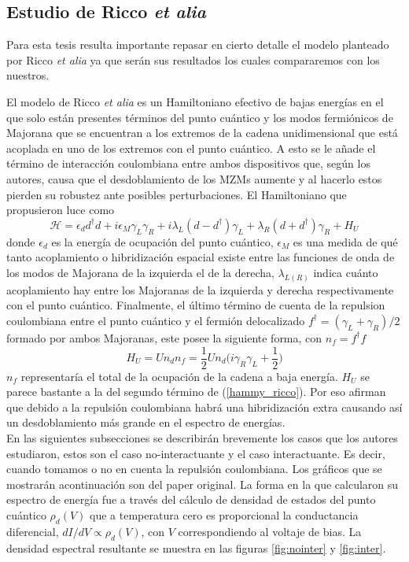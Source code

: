 \subsection{Estudio de Ricco \emph{et alia}}
Para esta tesis resulta importante repasar en cierto detalle el modelo planteado por Ricco \emph{et alia} ya que ser\'{a}n sus resultados los cuales compararemos con los nuestros.

El modelo de Ricco \emph{et alia} es un Hamiltoniano efectivo de bajas energ\'{i}as en el que solo est\'{a}n presentes t\'{e}rminos del punto cu\'{a}ntico y los modos fermi\'{o}nicos de Majorana que se encuentran a los extremos de la cadena unidimensional que est\'{a} acoplada en uno de los extremos con el punto cu\'{a}ntico. A esto se le a\~{n}ade el t\'{e}rmino de interacci\'{o}n coulombiana entre ambos dispositivos que, seg\'{u}n los autores, causa que el desdoblamiento de los MZMs aumente y al hacerlo estos pierden su robustez ante posibles perturbaciones. El Hamiltoniano que propusieron luce como 
\begin{equation}
    \mathcal{H}=\epsilon_d d^\dagger d + i\epsilon_M \gamma_L\gamma_R + i\lambda_L(d-d^\dagger)\gamma_L+\lambda_R(d+d^\dagger)\gamma_R + H_U
    \label{hammy_ricco}
\end{equation}
donde $\epsilon_d$ es la energ\'{i}a de ocupaci\'{o}n del punto cu\'{a}ntico, $\epsilon_M$ es una medida de qu\'{e} tanto acoplamiento o hibridizaci\'{o}n espacial existe entre las funciones de onda de los modos de Majorana de la izquierda el de la derecha, $\lambda_{L(R)}$ indica cu\'{a}nto acoplamiento hay entre los Majoranas de la izquierda y derecha respectivamente con el punto cu\'{a}ntico. Finalmente, el \'{u}ltimo t\'{e}rmino de cuenta de la repulsion coulombiana entre el punto cu\'{a}ntico y el fermi\'{o}n delocalizado $f^\dagger=(\gamma_L+\gamma_R)/2$ formado por ambos Majoranas, este posee la siguiente forma, con $n_f=f^\dagger f$
\begin{equation}
    H_U=U n_d n_f = \frac{1}{2}Un_d\Big( i\gamma_R\gamma_L+\frac{1}{2}\Big)
\end{equation}
$n_f$ representar\'{i}a el total de la ocupaci\'{o}n de la cadena a baja energ\'{i}a. $H_U$ se parece bastante a la del segundo t\'{e}rmino de (\ref{hammy_ricco}). Por eso afirman que debido a la repulsi\'{o}n coulombiana habr\'{a} una hibridizaci\'{o}n extra causando as\'{i} un desdoblamiento m\'{a}s grande en el espectro de energ\'{i}as.\\
En las siguientes subsecciones se describir\'{a}n brevemente los casos que los autores estudiaron, estos son el caso no-interactuante y el caso interactuante. Es decir, cuando tomamos o no en cuenta la repulsi\'{o}n coulombiana. Los gr\'{a}ficos que se mostrar\'{a}n acontinuaci\'{o}n son del paper original. La forma en la que calcularon su espectro de energ\'{i}a fue a trav\'{e}s del c\'{a}lculo de densidad de estados del punto cu\'{a}ntico $\rho_d(V)$ que a temperatura cero es proporcional la conductancia diferencial, $dI/dV \propto \rho_d(V)$, con $V$ correspondiendo al voltaje de bias. La densidad espectral resultante se muestra en las figuras \ref{fig:nointer} y \ref{fig:inter}.
